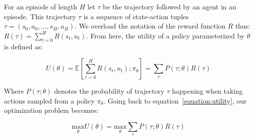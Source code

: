 \documentclass{../main.tex}{subfiles}
\begin{document}
For an episode  of length $H$ let $\tau$ be the trajectory followed by an agent in an episode. This trajectory $\tau$ is a sequence of state-action tuples $\tau = (s_0, a_0, \dots, s_H, a_H)$. We overload the notation of the reward function $R$ thus: $R(\tau) = \sum_{t=0}^{H}R(s_t, u_t)$. From here, the utility of a policy parameterized by $\theta$ is defined as:

\begin{equation}\label{equation:utility}
U(\theta) = \mathbb{E}[\sum_{t=0}^{H}R(s_t, u_t) ; \pi_{\theta}] = \sum_{\tau}P(\tau ; \theta)R(\tau)
\end{equation}

Where $P(\tau ; \theta)$ denotes the probability of trajectory $\tau$ happening when taking actions sampled from a policy $\pi_{\theta}$. Going back to equation~\ref{equation:utility}, our optimization problem becomes:

\begin{equation}\label{equation:utility-optimization}
\underset{\theta}{\text{max}} U(\theta) = \underset{\theta}{\text{max}} \sum_{\tau}P(\tau ; \theta)R(\tau)
\end{equation}
\end{document}
